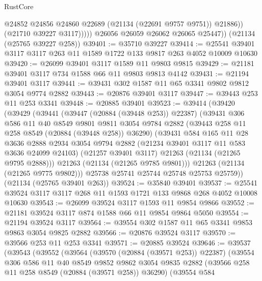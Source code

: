 \begin{lexlean}{RustCore}
\begin{coremodule}
                    @24852
                    @24856
                    @24860
                    @22689
                    (@21134 (@22691 @9757 @9751))
                    @21886))
                (@21710 @39227 @3117)))))
        @26056
        @26059
        @26062
        @26065
        @25447))
    (@21134 (@25765 @39227 @258))
@39401 := @35710 @39227
@39414 := @25541 @39401 @3117 @3117 @263 @11 @1589 @1722 @133 @9817 @263 @4052 @10009 @10630
@39420 := @26099 @39401 @3117 @1589 @11 @9803 @9815
@39429 := @21181 @39401 @3117 @734 @1588 @66 @11 @9803 @9813 @4142
@39431 := @21194 @39401 @3117
@39441 := @39431 @302 @1587 @11 @65 @3341 @9802 @9812 @3054 @9774 @2882
@39443 := @20876 @39401 @3117
@39447 := @39443 @253 @11 @253 @3341
@39448 := @20885 @39401
@39523 := @39414
    (@39420
      (@39429
        (@39441
          (@39447 (@20884 (@39448 @253)) @22387)
          (@39431
            @306
            @586
            @11
            @40
            @8549
            @9801
            @9811
            @3054
            @9784
            @2882
            (@39443 @258 @11 @258 @8549 (@20884 (@39448 @258)) @36290)
            (@39431
              @584
              @165
              @11
              @28
              @3636
              @2888
              @2934
              @3054
              @9794
              @2882
              (@21234 @39401 @3117 @11 @583 @3636 @24099 @24103)
              (@21257 @39401 @3117)
              @21263
              (@21134 (@21265 @9795 @2888)))
            @21263
            (@21134 (@21265 @9785 @9801)))
          @21263
          (@21134 (@21265 @9775 @9802)))
        @25738
        @25741
        @25744
        @25748
        @25753
        @25759))
    (@21134 (@25765 @39401 @263))
@39524 := @35840 @39401
@39537 := @25541 @39524 @3117 @3117 @268 @11 @1593 @1721 @133 @9868 @268 @4052 @10008 @10630
@39543 := @26099 @39524 @3117 @1593 @11 @9854 @9866
@39552 := @21181 @39524 @3117 @874 @1588 @66 @11 @9854 @9864 @5050
@39554 := @21194 @39524 @3117
@39564 := @39554 @302 @1587 @11 @65 @3341 @9853 @9863 @3054 @9825 @2882
@39566 := @20876 @39524 @3117
@39570 := @39566 @253 @11 @253 @3341
@39571 := @20885 @39524
@39646 := @39537
    (@39543
      (@39552
        (@39564
          (@39570 (@20884 (@39571 @253)) @22387)
          (@39554
            @306
            @586
            @11
            @40
            @8549
            @9852
            @9862
            @3054
            @9835
            @2882
            (@39566 @258 @11 @258 @8549 (@20884 (@39571 @258)) @36290)
            (@39554
              @584

\end{coremodule}
\end{lexlean}
